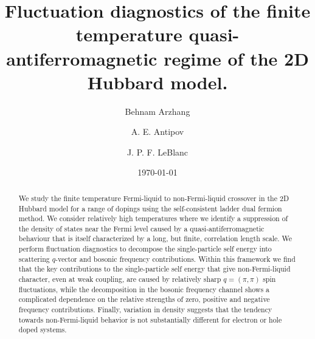\documentclass[twocolumn,notitlepage,prb,superscriptaddress,showpacs]{revtex4-1}
\begin{document}
\title{Fluctuation diagnostics of the finite temperature quasi-antiferromagnetic regime of the 2D Hubbard model.}
\author{Behnam Arzhang}
\author{A. E. Antipov}
\author{J. P. F. LeBlanc}

\date{\today}

\begin{abstract}
We study the finite temperature Fermi-liquid to non-Fermi-liquid crossover in the 2D Hubbard model for a range of dopings using the self-consistent ladder dual fermion method.
 We consider relatively high temperatures where we identify a suppression of the density of states near the Fermi level caused by a quasi-antiferromagnetic behaviour that is itself characterized by a long, but finite, correlation length scale.  We perform fluctuation diagnostics to decompose the single-particle self energy into scattering $q$-vector and bosonic frequency contributions.  Within this framework we find that the key contributions to the single-particle self energy that give non-Fermi-liquid character, even at weak coupling, are caused by relatively sharp $q=(\pi,\pi)$ spin fluctuations, while the decomposition in the bosonic frequency channel shows a complicated dependence on the relative strengths of zero, positive and negative frequency contributions.  Finally, variation in density suggests that the tendency towards non-Fermi-liquid behavior is not substantially different for electron or hole doped systems.
\end{abstract}

\maketitle
\end{document}
